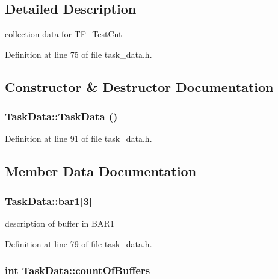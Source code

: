 \subsection{Detailed Description}
collection data for \hyperlink{classTF__TestCnt}{TF\_\-TestCnt} 

Definition at line 75 of file task\_\-data.h.

\subsection{Constructor \& Destructor Documentation}
\hypertarget{structTaskData_a527fe3ca19e5dc328a58a8784ff0607d}{
\subsubsection[{TaskData}]{\setlength{\rightskip}{0pt plus 5cm}TaskData::TaskData ()}}
\label{structTaskData_a527fe3ca19e5dc328a58a8784ff0607d}


Definition at line 91 of file task\_\-data.h.

\subsection{Member Data Documentation}
\hypertarget{structTaskData_ab7cbd8321c8573a90488c7d1fd843068}{
\subsubsection[{bar1}]{ {\bf TaskData::bar1}\mbox{[}3\mbox{]}}}
\label{structTaskData_ab7cbd8321c8573a90488c7d1fd843068}


description of buffer in BAR1 

Definition at line 79 of file task\_\-data.h.\hypertarget{structTaskData_a07b21936ab1d6c2d9f5f69f0b3da4e69}{
\subsubsection[{countOfBuffers}]{\setlength{\rightskip}{0pt plus 5cm}int {\bf TaskData::countOfBuffers}}}
\label{structTaskData_a07b21936ab1d6c2d9f5f69f0b3da4e69}


